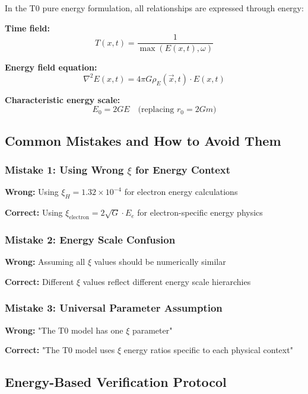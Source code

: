 \documentclass[12pt,a4paper]{article}
\begin{document}
In the T0 pure energy formulation, all relationships are expressed through energy:

\textbf{Time field:}
\begin{equation}
	T(x,t) = \frac{1}{\max(E(x,t), \omega)}
\end{equation}

\textbf{Energy field equation:}
\begin{equation}
	\nabla^2 E(x,t) = 4\pi G \rho_E(\vec{x},t) \cdot E(x,t)
\end{equation}

\textbf{Characteristic energy scale:}
\begin{equation}
	E_0 = 2GE \quad \text{(replacing } r_0 = 2Gm\text{)}
\end{equation}

\subsection{Common Mistakes and How to Avoid Them}
\label{subsec:common_mistakes}

\subsubsection{Mistake 1: Using Wrong $\xi$ for Energy Context}
\textbf{Wrong:} Using $\xi_H = 1.32 \times 10^{-4}$ for electron energy calculations

\textbf{Correct:} Using $\xi_{\text{electron}} = 2\sqrt{G} \cdot E_e$ for electron-specific energy physics

\subsubsection{Mistake 2: Energy Scale Confusion}
\textbf{Wrong:} Assuming all $\xi$ values should be numerically similar

\textbf{Correct:} Different $\xi$ values reflect different energy scale hierarchies

\subsubsection{Mistake 3: Universal Parameter Assumption}
\textbf{Wrong:} "The T0 model has one $\xi$ parameter"

\textbf{Correct:} "The T0 model uses $\xi$ energy ratios specific to each physical context"

\subsection{Energy-Based Verification Protocol}
\label{subsec:energy_verification_protocol}
\end{document}

